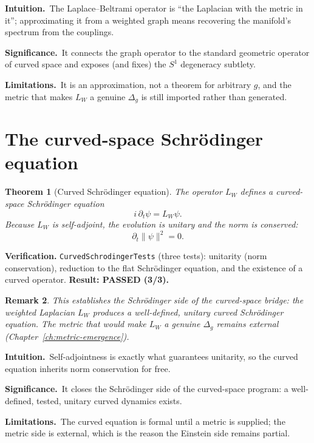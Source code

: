 \documentclass[10pt,twoside,openany]{book}
\newtheorem{theorem}{Theorem}[chapter]
\newtheorem{remark}[theorem]{Remark}
\newcommand{\theoremnotes}[3]{%
  \par\medskip\noindent
  \textbf{Intuition.}\ #1\par
  \textbf{Significance.}\ #2\par
  \textbf{Limitations.}\ #3\par}
\begin{document}
\theoremnotes
{The Laplace--Beltrami operator is ``the Laplacian with the metric in it''; approximating
it from a weighted graph means recovering the manifold's spectrum from the couplings.}
{It connects the graph operator to the standard geometric operator of curved space and
exposes (and fixes) the $S^1$ degeneracy subtlety.}
{It is an approximation, not a theorem for arbitrary $g$, and the metric that makes $L_W$
a genuine $\Delta_g$ is still imported rather than generated.}

\section{The curved-space Schr\"odinger equation}
\label{ch:curved-schrodinger}

\begin{theorem}[Curved Schr\"odinger equation]
The operator $L_W$ defines a curved-space Schr\"odinger equation
\begin{equation}
i\,\partial_t \psi = L_W \psi .
\end{equation}
Because $L_W$ is self-adjoint, the evolution is unitary and the norm is conserved:
\begin{equation}
\partial_t \|\psi\|^2 = 0 .
\end{equation}
\end{theorem}

\textbf{Verification.} \texttt{CurvedSchrodingerTests} (three tests): unitarity (norm
conservation), reduction to the flat Schr\"odinger equation, and the existence of a
curved operator. \textbf{Result: PASSED (3/3).}

\begin{remark}
This establishes the \emph{Schr\"odinger} side of the curved-space bridge: the weighted
Laplacian $L_W$ produces a well-defined, unitary curved Schr\"odinger equation. The
\emph{metric} that would make $L_W$ a genuine $\Delta_g$ remains external
(Chapter~\ref{ch:metric-emergence}).
\end{remark}

\theoremnotes
{Self-adjointness is exactly what guarantees unitarity, so the curved equation inherits
norm conservation for free.}
{It closes the Schr\"odinger side of the curved-space program: a well-defined, tested,
unitary curved dynamics exists.}
{The curved equation is formal until a metric is supplied; the metric side is external,
which is the reason the Einstein side remains partial.}

\end{document}
